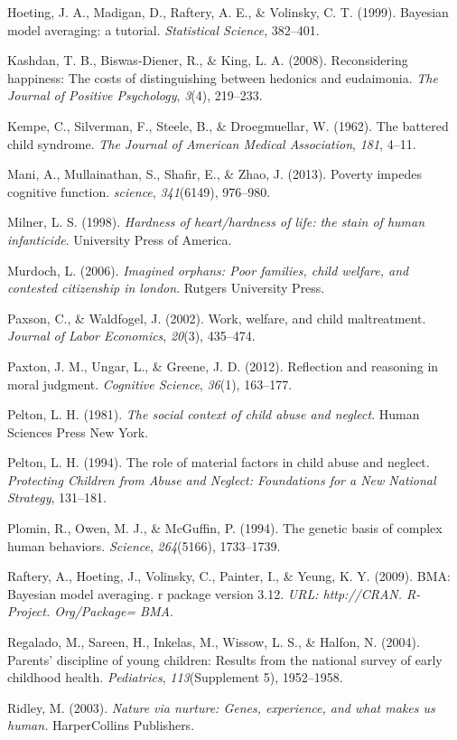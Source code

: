 \documentclass[review]{elsarticle}\usepackage[]{graphicx}\usepackage[]{color}
\begin{document}
Hoeting, J. A., Madigan, D., Raftery, A. E., \& Volinsky, C. T. (1999).
Bayesian model averaging: a tutorial. \emph{Statistical Science},
382--401.

Kashdan, T. B., Biswas-Diener, R., \& King, L. A. (2008). Reconsidering
happiness: The costs of distinguishing between hedonics and eudaimonia.
\emph{The Journal of Positive Psychology}, \emph{3}(4), 219--233.

Kempe, C., Silverman, F., Steele, B., \& Droegmuellar, W. (1962). The
battered child syndrome. \emph{The Journal of American Medical
Association}, \emph{181}, 4--11.

Mani, A., Mullainathan, S., Shafir, E., \& Zhao, J. (2013). Poverty
impedes cognitive function. \emph{science}, \emph{341}(6149), 976--980.

Milner, L. S. (1998). \emph{Hardness of heart/hardness of life: the
stain of human infanticide}. University Press of America.

Murdoch, L. (2006). \emph{Imagined orphans: Poor families, child
welfare, and contested citizenship in london}. Rutgers University Press.

Paxson, C., \& Waldfogel, J. (2002). Work, welfare, and child
maltreatment. \emph{Journal of Labor Economics}, \emph{20}(3), 435--474.

Paxton, J. M., Ungar, L., \& Greene, J. D. (2012). Reflection and
reasoning in moral judgment. \emph{Cognitive Science}, \emph{36}(1),
163--177.

Pelton, L. H. (1981). \emph{The social context of child abuse and
neglect}. Human Sciences Press New York.

Pelton, L. H. (1994). The role of material factors in child abuse and
neglect. \emph{Protecting Children from Abuse and Neglect: Foundations
for a New National Strategy}, 131--181.

Plomin, R., Owen, M. J., \& McGuffin, P. (1994). The genetic basis of
complex human behaviors. \emph{Science}, \emph{264}(5166), 1733--1739.

Raftery, A., Hoeting, J., Volinsky, C., Painter, I., \& Yeung, K. Y.
(2009). BMA: Bayesian model averaging. r package version 3.12.
\emph{URL: http://CRAN. R-Project. Org/Package= BMA}.

Regalado, M., Sareen, H., Inkelas, M., Wissow, L. S., \& Halfon, N.
(2004). Parents' discipline of young children: Results from the national
survey of early childhood health. \emph{Pediatrics},
\emph{113}(Supplement 5), 1952--1958.

Ridley, M. (2003). \emph{Nature via nurture: Genes, experience, and what
makes us human.} HarperCollins Publishers.
\end{document}
